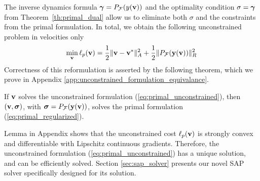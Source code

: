 The inverse dynamics formula ${\bm\gamma} = P_{\mathcal{F}}(y({\mathbf{v}}))$  and the optimality
condition $\sigma = {\bm\gamma}$ from Theorem~\ref{th:primal_dual}
allow us to eliminate both $\sigma$ and the constraints from the primal
formulation. In total, we obtain the following unconstrained problem
in velocities only
\begin{eqnarray}
	\min_{\mf{v}} \ell_p(\mf{v}) = \frac{1}{2}\Vert\mf{v}-\mf{v}^*\Vert_{A}^2 +
	\frac{1}{2}\Vert P_\mathcal{F}(\mf{y}(\mf{v}))\Vert_R^2
	\label{eq:primal_unconstrained}
\end{eqnarray}
Correctness of this reformulation is asserted by the following theorem, 
which we prove in Appendix \ref{app:unconstrained_formulation_equivalance}.
\begin{theorem}
  If  ${\mathbf{v}}$ solves the unconstrained formulation (\ref{eq:primal_unconstrained}),
    then $({\mathbf{v}}, {\bm\sigma})$,
    with ${\bm\sigma} =P_\mathcal{F}({\mathbf{y}}({\mathbf{v}}))$,
    solves the primal
    formulation (\ref{eq:primal_regularized}).
    \label{th:unconstrained_formulation_equivalance}
\end{theorem}
Lemma  in Appendix  shows
that the unconstrained cost $\ell_p({\mathbf{v}})$ is strongly convex and
differentiable with Lipschitz continuous gradients. Therefore, the 
unconstrained formulation (\ref{eq:primal_unconstrained}) has a unique solution,
and can be efficiently solved.  
Section \ref{sec:sap_solver} presents our novel SAP solver specifically designed
for its solution.
